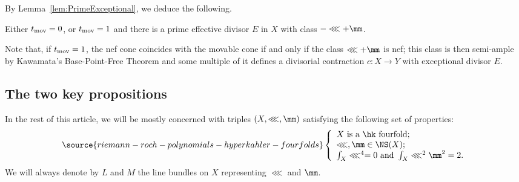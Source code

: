 
By Lemma~\ref{lem:PrimeExceptional}, we deduce  the following.

\begin{lemm}\label{lem61}
Either $t_{\textnormal{mov}}=0$, or $t_{\textnormal{mov}}=1$ and there is a prime effective divisor $E$ in $X$ with class $-\lll+\mm$.
\end{lemm}

Note that, if $t_{\textnormal{mov}}=1$, the nef cone coincides with the movable cone if and only if the class $\lll+\mm$ is nef; this class is then semi-ample by Kawamata's Base-Point-Free Theorem and some multiple of it defines a divisorial contraction $c\colon X\to Y$ with exceptional divisor $E$.


\subsection{The two key propositions}\label{subsec:HKNefCone}

In the rest of this article, we will be mostly concerned with triples $(X,\lll,\mm)$ satisfying the following set of properties:
\begin{equation}\label{hypo}
\source{riemann-roch-polynomials-hyperkahler-fourfolds}
    \left\{
    \begin{array}{l}
    X \hbox{ is a  \hk\ fourfold;}\\
   \lll, \mm\in \NS(X);\\
   \int_X \lll^{4}=0 \hbox { and }\int_X \lll^{2}\mm^{2}=2.
    \end{array}
    \right.
\end{equation}
We will always denote by $L$ and $M$ the line bundles on $X$ representing $\lll$ and $\mm$.

